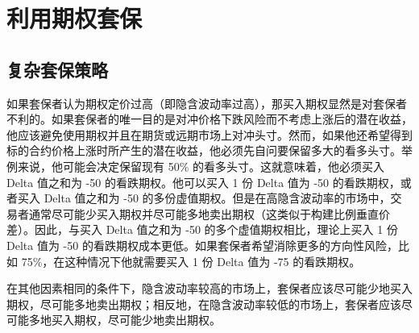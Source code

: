 \chapter{利用期权套保}
\section{复杂套保策略}
如果套保者认为期权定价过高（即隐含波动率过高），那买入期权显然是对套保者不利的。如果套保者的唯一目的是对冲价格下跌风险而不考虑上涨后的潜在收益，他应该避免使用期权并且在期货或远期市场上对冲头寸。然而，如果他还希望得到标的合约价格上涨时所产生的潜在收益，他必须先自问要保留多大的看多头寸。举例来说，他可能会决定保留现有 50\% 的看多头寸。这就意味着，他必须买入 Delta 值之和为 -50 的看跌期权。他可以买入 1 份 Delta 值为 -50 的看跌期权，或者买入 Delta 值之和为 -50 的多份虚值期权。但是在高隐含波动率的市场中，交易者通常尽可能少买入期权并尽可能多地卖出期权（这类似于构建比例垂直价差）。因此，与买入 Delta 值之和为 -50 的多个虚值期权相比，理论上买入 1 份 Delta 值为 -50 的看跌期权成本更低。如果套保者希望消除更多的方向性风险，比如 75\%，在这种情况下他就需要买入 1 份 Delta 值为 -75 的看跌期权。
\begin{tcolorbox}
    在其他因素相同的条件下，隐含波动率较高的市场上，套保者应该尽可能少地买入期权，尽可能多地卖出期权；相反地，在隐含波动率较低的市场上，套保者应该尽可能多地买入期权，尽可能少地卖出期权。
\end{tcolorbox}